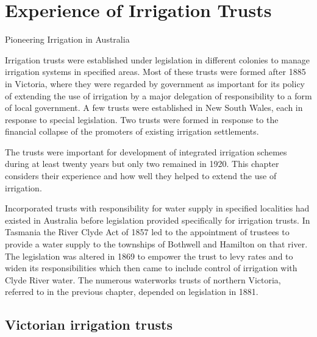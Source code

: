 
\setcounter{endnote}{0}

\chapter{Experience of Irrigation Trusts}
\label{ch:trusts}
%
{Pioneering Irrigation in Australia}

Irrigation trusts were established under legislation in different
colonies to manage irrigation systems in specified areas. Most of
these trusts were formed after 1885 in Victoria, where they were
regarded by government as important for its policy of extending the
use of irrigation by a major delegation of responsibility to a form of
local government.  A few trusts were established in New South Wales,
each in response to special legislation.  Two trusts were formed in
response to the financial collapse of the promoters of existing
irrigation settlements.

The trusts were important for development of integrated irrigation
schemes during at least twenty years but only two remained in 1920.
This chapter considers their experience and how well they helped to
extend the use of irrigation.

Incorporated trusts with responsibility for water supply in specified
localities had existed in Australia before legislation provided
specifically for irrigation trusts.  In Tasmania the River Clyde Act
of 1857 led to the appointment of trustees to provide a water supply
to the townships of Bothwell and Hamilton on that river.  The
legislation was altered in 1869 to empower the trust to levy rates and
to widen its responsibilities which then came to include control of
irrigation with Clyde River water.  The numerous waterworks trusts of
northern Victoria, referred to in the previous chapter, depended on
legislation in 1881.

\section*{Victorian irrigation trusts}

